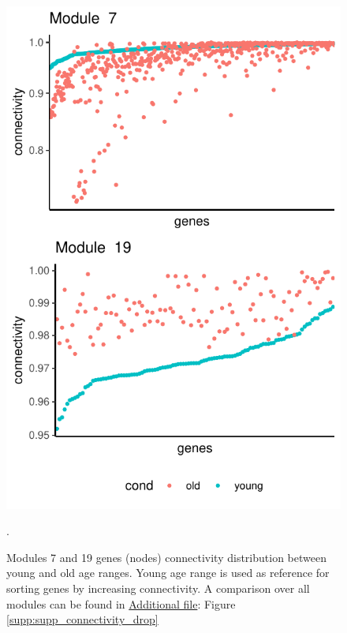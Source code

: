 \begin{figure}[!ht]
    \centering
    \includegraphics{img/chap1/figure_3.pdf}
    \caption[Modules 7 and 19 genes (nodes) connectivity distribution between young and old age ranges]{Modules 7 and 19 genes (nodes) connectivity distribution between young and old age ranges. Young age range is used as reference for sorting genes by increasing connectivity. A comparison over all modules can be found in \hyperref[annexe:supp_file_GWENA]{Additional file}: Figure \ref{supp:supp_connectivity_drop}}.
    \label{fig:fig_connectivity_drop}
\end{figure}


